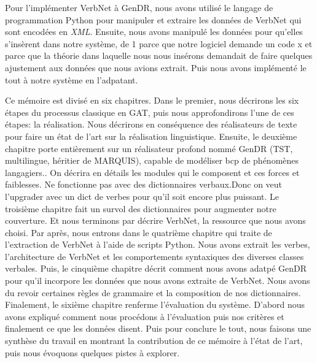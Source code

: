 Pour l'implémenter VerbNet à GenDR, nous avons utilisé le langage de programmation Python pour manipuler et extraire les données de VerbNet qui sont encodées en \emph{XML}. Ensuite, nous avons manipulé les données pour qu'elles s'insèrent dans notre système, de 1 parce que notre logiciel demande un code x et parce que la théorie dans laquelle nous nous insérons demandait de faire quelques ajustement aux données que nous avions extrait. Puis nous avons implémenté le tout à notre système en l'adpatant.

Ce mémoire est divisé en six chapitres. Dans le premier, nous décrirons les six étapes du processus classique en \ac{GAT}, puis nous approfondirons l'une de ces étapes: la réalisation. Nous décrirons en conséquence des réalisateurs de texte pour faire un état de l'art sur la réalisation linguistique. Ensuite, le deuxième chapitre porte entièrement sur un réalisateur profond nommé GenDR (TST, multilingue, héritier de MARQUIS), capable de modéliser bcp de phénomènes langagiers.. On décrira en détails les modules qui le composent et ces forces et faiblesses. Ne fonctionne pas avec des dictionnaires verbaux.Donc on veut l'upgrader avec un dict de verbes pour qu'il soit encore plus puissant. Le troisième chapitre fait un survol des dictionnaires pour augmenter notre couverture. Et nous terminons par décrire VerbNet, la ressource que nous avons choisi. Par après, nous entrons dans le quatrième chapitre qui traite de l'extraction de VerbNet à l'aide de scripts Python. Nous avons extrait les verbes, l'architecture de VerbNet et les comportements syntaxiques des diverses classes verbales. Puis, le cinquième chapitre décrit comment nous avons adatpé GenDR pour qu'il incorpore les données que nous avons extraite de VerbNet. Nous avons du revoir certaines règles de grammaire et la composition de nos dictionnaires. Finalement, le sixième chapitre renferme l'évaluation du système. D'abord nous avons expliqué comment nous procédons à l'évaluation puis nos critères et finalement ce que les données disent. Puis pour conclure le tout, nous faisons une synthèse du travail en montrant la contribution de ce mémoire à l'état de l'art, puis nous évoquons quelques pistes à explorer.

